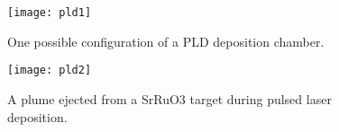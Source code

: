 \begin{figure}[h!]
\centering
\texttt{[image: pld1]}
\caption{One possible configuration of a PLD deposition chamber.}
\end{figure}

\begin{figure}[h!]
\centering
\texttt{[image: pld2]}
\caption{A plume ejected from a SrRuO3 target during pulsed laser deposition.}
\end{figure}
